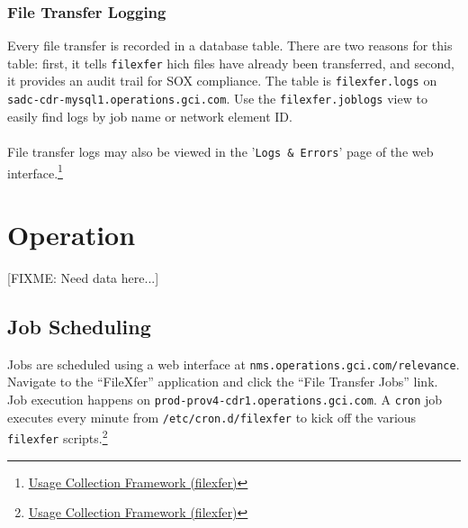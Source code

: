 \documentclass[12pt,letterpaper,dvips]{article}
\newcommand{\FIXME}[1]{\textsf{[FIXME: #1]}}
\begin{document}
\subsubsection{File Transfer Logging}
Every file transfer is recorded in a database table. There are
two reasons for this table: first, it tells \texttt{filexfer}
hich files have already been transferred, and second, it
provides an audit trail for SOX compliance. The table is
\texttt{filexfer.logs} on
\texttt{sadc-cdr-mysql1.operations.gci.com}. Use the
\texttt{filexfer.joblogs} view to easily find logs by job name
or network element ID.\\
\\
File transfer logs may also be viewed in the
'\texttt{Logs \& Errors}' page of the web interface.\footnote{\href{http://oss-wiki.operations.gci.com/dev/index.php/Usage_Collection\_Framework\_(filexfer)}{Usage Collection Framework (filexfer)}}


\newpage
\section{Operation}
\FIXME{Need data here...}


\subsection{Job Scheduling}
Jobs are scheduled using a web interface at
\texttt{nms.operations.gci.com/relevance}.  Navigate to the
``FileXfer'' application and click the ``File Transfer Jobs'' link.
Job execution happens on \texttt{prod-prov4-cdr1.operations.gci.com}.
A \texttt{cron} job executes every minute from
\texttt{/etc/cron.d/filexfer} to kick off the various \texttt{filexfer}
scripts.\footnote{\href{http://oss-wiki.operations.gci.com/dev/index.php/Usage\_Collection\_Framework\_(filexfer)}{Usage
    Collection Framework (filexfer)}}


\end{document}
